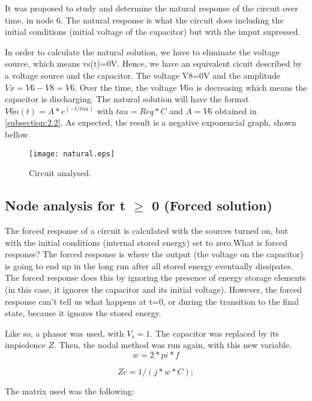 It was proposed to study and determine the natural response of the circuit over time, in node 6. The natural response is what the circuit does including the initial conditions (initial voltage of the capacitor) but with the imput supressed. 

In order to calculate the natural solution, we have to eliminate the voltage source, which means vs(t)=0V. Hence, we have an equivalent cicuit described by a voltage source and the capacitor. The voltage V8=0V and the amplitude $Vx=V6-V8=V6$. Over the time, the voltage $V{6n}$ is decreasing which means the capacitor is discharging. The natural solution will have the format $V{6n}(t)=A*e^{(-t/tau)}$ with $tau=Req*C$ and $A=V6$ obtained in \ref{subsection:2.2}. As expected, the result is a negative exponencial graph, shown bellow.

\begin{figure}[ht] \centering
\texttt{[image: natural.eps]}
\caption{Circuit analysed.}
\label{fig:sim3}
\end{figure}



\subsection{Node analysis for t $\ge$ 0 (Forced solution)}

The forced response of a circuit is calculated with the sources turned on, but with the initial conditions (internal stored energy) set to zero.What is forced response? The forced response is where the output (the voltage on the capacitor) is going to end up in the long run after all stored energy eventually dissipates. The forced response does this by ignoring the presence of energy storage elements (in this case, it ignores the capacitor and its initial voltage). However, the forced response can't tell us what happens at t=0, or during the transition to the final state, because it ignores the stored energy. 
\par Like so, a phasor was used, with $V_{s}=1$. The capacitor was replaced by its impiedence $Z$. Then, the nodal method was run again, with this new variable.
\begin{equation}
w=2*pi*f
\end{equation} 

\begin{equation}
Zc=1/(j*w*C);
\end{equation} 

\par The matrix used was the following:

